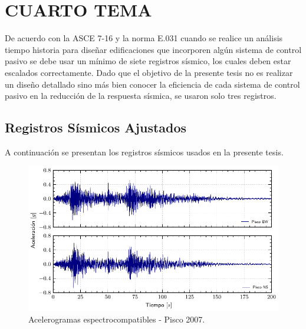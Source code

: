 \section{CUARTO TEMA}

De acuerdo con la ASCE 7-16 y la norma E.031 cuando se realice un análisis tiempo historia para diseñar edificaciones que incorporen algún sistema de control pasivo se debe usar un mínimo de siete registros sísmico, los cuales deben estar escalados correctamente. Dado que el objetivo de la presente tesis no es realizar un diseño detallado sino más bien conocer la eficiencia de cada sistema de control pasivo en la reducción de la respuesta sísmica, se usaron solo tres registros.

	\subsection{Registros Sísmicos Ajustados}
	
A continuación se presentan los registros sísmicos usados en la presente tesis.
			
	\begin{figure}[h!]
	\centering
	\includegraphics[scale=1]{E_IMAGENES/2_Capitulo2/Cap2_PiscoSc.pdf}
	\vspace{-8 mm}
	\caption[Acelerogramas espectrocompatibles - Pisco 2007]{\centering\footnotesize Acelerogramas espectrocompatibles - Pisco 2007.}
	\label{Cap2_Figura15}
	\end{figure}	
			
